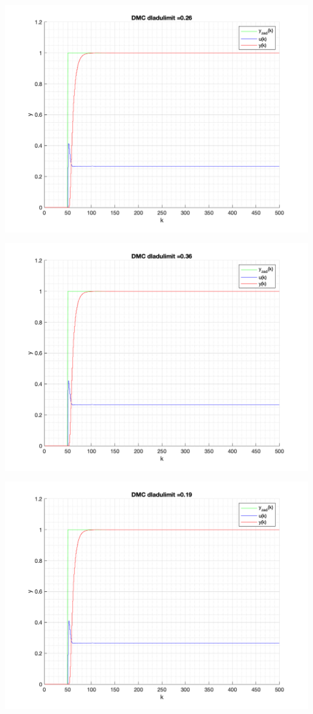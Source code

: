 \documentclass[a4paper, 11pt]{article}
\begin{document}
\begin{enumerate}
 \includegraphics[width=\linewidth]{./ModelsP6_dulimit/P4_DMC_dulimit_0_26_png.png} 
 
 \includegraphics[width=\linewidth]{./ModelsP6_dulimit/P4_DMC_dulimit_0_36_png.png} 
 
 \includegraphics[width=\linewidth]{./ModelsP6_dulimit/P4_DMC_dulimit_0_19_png.png} 
 

\end{enumerate}
\end{document}
